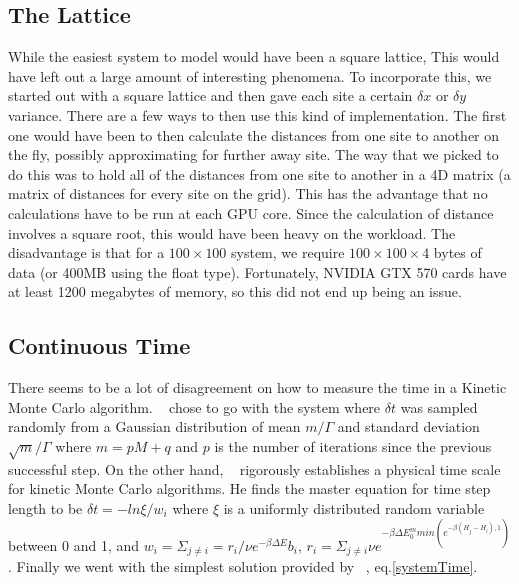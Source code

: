 \subsection{The Lattice}
While the easiest system to model would have been a square lattice, This would have left out a large amount of interesting phenomena. To incorporate this, we started out with a square lattice and then gave each site a certain $\delta x$ or $\delta y$ variance. There are a few ways to then use this kind of implementation. The first one would have been to then calculate the distances from one site to another on the fly, possibly approximating for further away site. The way that we picked to do this was to hold all of the distances from one site to another in a 4D matrix (a matrix of distances for every site on the grid). This has the advantage that no calculations have to be run at each GPU core. Since the calculation of distance involves a square root, this would have been heavy on the workload. The disadvantage is that for a $100 \times 100 $ system, we require $100 \times 100 \times 4$ bytes of data (or 400MB using the float type). Fortunately, NVIDIA GTX 570 cards have at least 1200 megabytes of memory, so this did not end up being an issue.

\subsection{Continuous Time}
There seems to be a lot of disagreement on how to measure the time in a Kinetic Monte Carlo algorithm. ~\cite{Ferrero14} chose to go with the system where $\delta t$ was sampled randomly from a Gaussian distribution of mean $m/ \Gamma$ and standard deviation $\sqrt{m}/\Gamma$ where $m = p M + q$ and $p$ is the number of iterations since the previous successful step. On the other hand, ~\cite{Serebrinsky11} rigorously establishes a physical time scale for kinetic Monte Carlo algorithms. He finds the master equation for time step length to be $\delta t = -ln{\xi} / w_i$ where $\xi$ is a uniformly distributed random variable between 0 and 1, and $w_i = \Sigma_{j \neq i} = r_i / \nu e^{-\beta \Delta E} b_i$, $r_i = \Sigma_{j \neq i} \nu e^{-\beta \Delta E^m_0 min(e^{-\beta (H_j - H_i ),1 })}$. Finally we went with the simplest solution provided by ~\cite{Newman99}, eq.\ref{systemTime}. 

